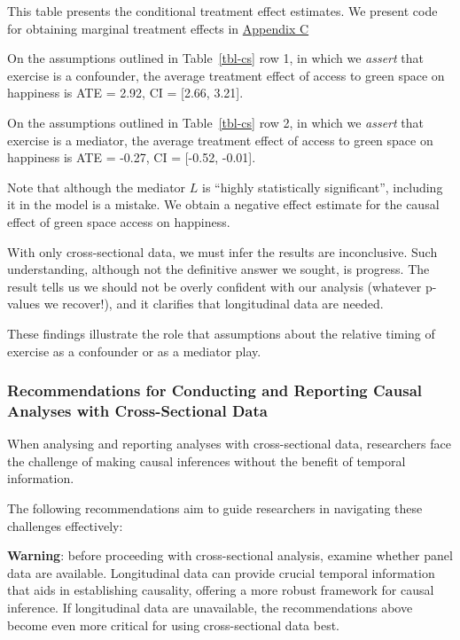 \documentclass[
  single column]{article}
\begin{document}
This table presents the conditional treatment effect estimates. We
present code for obtaining marginal treatment effects in
\hyperref[appendix-c]{Appendix C}

On the assumptions outlined in Table~\ref{tbl-cs} row 1, in which we
\emph{assert} that exercise is a confounder, the average treatment
effect of access to green space on happiness is ATE = 2.92, CI =
{[}2.66, 3.21{]}.

On the assumptions outlined in Table~\ref{tbl-cs} row 2, in which we
\emph{assert} that exercise is a mediator, the average treatment effect
of access to green space on happiness is ATE = -0.27, CI = {[}-0.52,
-0.01{]}.

Note that although the mediator \(L\) is ``highly statistically
significant'', including it in the model is a mistake. We obtain a
negative effect estimate for the causal effect of green space access on
happiness.

With only cross-sectional data, we must infer the results are
inconclusive. Such understanding, although not the definitive answer we
sought, is progress. The result tells us we should not be overly
confident with our analysis (whatever p-values we recover!), and it
clarifies that longitudinal data are needed.

These findings illustrate the role that assumptions about the relative
timing of exercise as a confounder or as a mediator play.

\subsubsection{Recommendations for Conducting and Reporting Causal
Analyses with Cross-Sectional
Data}\label{recommendations-for-conducting-and-reporting-causal-analyses-with-cross-sectional-data}

When analysing and reporting analyses with cross-sectional data,
researchers face the challenge of making causal inferences without the
benefit of temporal information.

The following recommendations aim to guide researchers in navigating
these challenges effectively:

\textbf{Warning}: before proceeding with cross-sectional analysis,
examine whether panel data are available. Longitudinal data can provide
crucial temporal information that aids in establishing causality,
offering a more robust framework for causal inference. If longitudinal
data are unavailable, the recommendations above become even more
critical for using cross-sectional data best.
\end{document}
